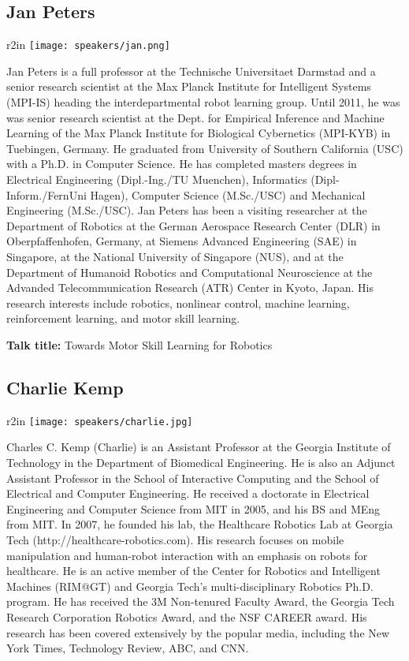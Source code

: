  \subsection*{Jan Peters}
\begin{wrapfigure}{r}{2in}
\centering
\texttt{[image: speakers/jan.png]}
\end{wrapfigure}Jan Peters is a full professor at the Technische Universitaet Darmstad and a senior research scientist at the Max Planck Institute for Intelligent Systems (MPI-IS) heading the interdepartmental robot learning group. Until 2011, he was was senior research scientist at the Dept. for Empirical Inference and Machine Learning of the Max Planck Institute for Biological Cybernetics (MPI-KYB) in Tuebingen, Germany. He graduated from University of Southern California (USC) with a Ph.D. in Computer Science. He has completed masters degrees in Electrical Engineering (Dipl.-Ing./TU Muenchen), Informatics (Dipl-Inform./FernUni Hagen), Computer Science (M.Sc./USC) and Mechanical Engineering (M.Sc./USC). Jan Peters has been a visiting researcher at the Department of Robotics at the German Aerospace Research Center (DLR) in Oberpfaffenhofen, Germany, at Siemens Advanced Engineering (SAE) in Singapore, at the National University of Singapore (NUS), and at the Department of Humanoid Robotics and Computational Neuroscience at the Advanded Telecommunication Research (ATR) Center in Kyoto, Japan. His research interests include robotics, nonlinear control, machine learning, reinforcement learning, and motor skill learning.

\bigskip
{\bf Talk title:} Towards Motor Skill Learning for Robotics


\newpage
\subsection*{Charlie Kemp}
\begin{wrapfigure}{r}{2in}
\centering
\texttt{[image: speakers/charlie.jpg]}
\end{wrapfigure}
Charles C. Kemp (Charlie) is an Assistant Professor at the Georgia Institute of Technology in the Department of Biomedical Engineering. He is also an Adjunct Assistant Professor in the School of Interactive Computing and the School of Electrical and Computer Engineering. He received a doctorate in Electrical Engineering and Computer Science from MIT in 2005, and his BS and MEng from MIT. In 2007, he founded his lab, the Healthcare Robotics Lab at Georgia Tech (http://healthcare-robotics.com). His research focuses on mobile manipulation and human-robot interaction with an emphasis on robots for healthcare. He is an active member of the Center for Robotics and Intelligent Machines (RIM@GT) and Georgia Tech's multi-disciplinary Robotics Ph.D. program. He has received the 3M Non-tenured Faculty Award, the Georgia Tech Research Corporation Robotics Award, and the NSF CAREER award. His research has been covered extensively by the popular media, including the New York Times, Technology Review, ABC, and CNN.
 

